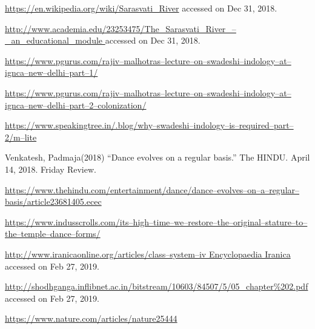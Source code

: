 \begin{thebibliography}{99}
  \url{https://en.wikipedia.org/wiki/Sarasvati_River} accessed on Dec 31, 2018.

  \url{http://www.academia.edu/23253475/The_Sarasvati_River_–_an_educational_module
 } accessed on Dec 31, 2018.

  \url{https://www.pgurus.com/rajiv–malhotras–lecture–on–swadeshi–indology–at–ignca–new–delhi–part–1/
 }

  \url{https://www.pgurus.com/rajiv–malhotras–lecture–on–swadeshi–indology–at–ignca–new–delhi–part–2–colonization/}

  \url{https://www.speakingtree.in/.blog/why–swadeshi–indology–is–required–part–2/m–lite}

  Venkatesh, Padmaja(2018) “Dance evolves on a regular basis.” The HINDU. April 14, 2018. Friday Review.

  \url{https://www.thehindu.com/entertainment/dance/dance–evolves–on–a–regular–basis/article23681405.ecec}

  \url{https://www.indusscrolls.com/its–high–time–we–restore–the–original–stature–to–the–temple–dance–forms/}

  \url{http://www.iranicaonline.org/articles/class–system–iv Encyclopaedia Iranica} accessed on Feb 27, 2019.

  \url{http://shodhganga.inflibnet.ac.in/bitstream/10603/84507/5/05_chapter%202.pdf} accessed on Feb 27, 2019.

  \url{https://www.nature.com/articles/nature25444}

 \end{thebibliography}

\vskip 1cm

\theendnotes


